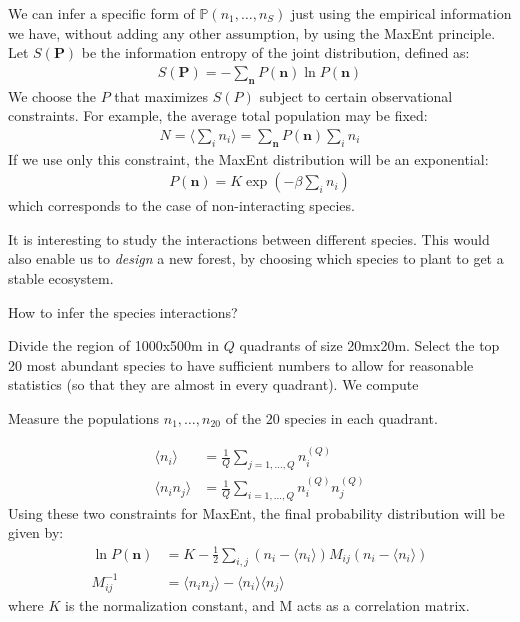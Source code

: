 \documentclass[../../main.tex]{subfiles}
\begin{document}
We can infer a specific form of $\mathbb{P}(n_1, \dots, n_S)$ just using the empirical information we have, without adding any other assumption, by using the MaxEnt principle. Let $S(\bm{P})$ be the information entropy of the joint distribution, defined as:
\begin{align*}
    S(\bm{P}) = - \sum_{\bm{n}} P(\bm{n}) \ln P(\bm{n})
\end{align*}
We choose the $P$ that maximizes $S(P)$ subject to certain observational constraints. For example, the average total population may be fixed:
\begin{align*}
    N = \langle \sum_i n_i \rangle = \sum_{\bm{n}} P(\bm{n}) \sum_i n_i
\end{align*}
If we use only this constraint, the MaxEnt distribution will be an exponential:
\begin{align*}
    P(\bm{n}) = K \exp(-\beta \sum_i n_i)
\end{align*}
which corresponds to the case of non-interacting species.

\medskip

It is interesting to study the interactions between different species. This would also enable us to \textit{design} a new forest, by choosing which species to plant to get a stable ecosystem. 


How to infer the species interactions?

Divide the region of 1000x500m in $Q$ quadrants of size 20mx20m. Select the top 20 most abundant species to have sufficient numbers to allow for reasonable statistics (so that they are almost in every quadrant). We compute 

Measure the populations $n_1, \dots, n_{20}$ of the $20$ species in each quadrant.

\begin{align*}
    \langle n_i \rangle &= \frac{1}{Q} \sum_{j=1,\dots,Q} n_i^{(Q)}\\
    \langle n_i n_j \rangle &= \frac{1}{Q} \sum_{i=1,\dots,Q} n_i^{(Q)} n_j^{(Q)} 
\end{align*}
Using these two constraints for MaxEnt, the final probability distribution will be given by:
\begin{align*}
    \ln P(\bm{n}) &= K - \frac{1}{2} \sum_{i,j} (n_i - \langle n_i \rangle) M_{ij} (n_i - \langle n_i \rangle)\\
    M_{ij}^{-1} &= \langle n_i n_j \rangle - \langle n_i \rangle \langle n_j \rangle
\end{align*}
where $K$ is the normalization constant, and $\mathrm{M}$ acts as a correlation matrix. %
\end{document}
